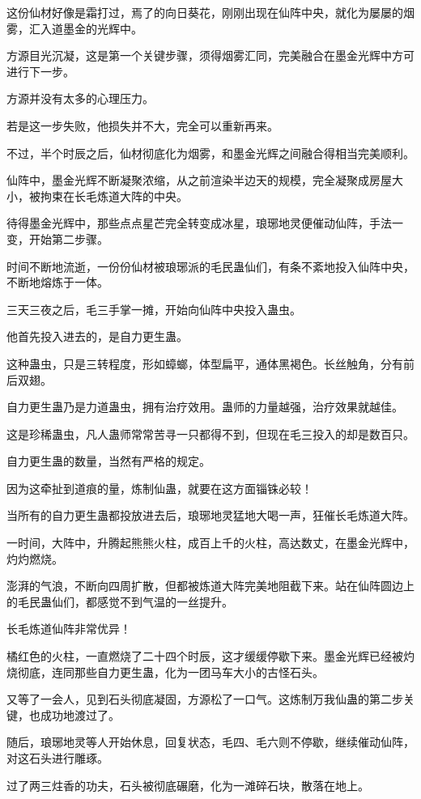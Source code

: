 \begin{this_body}
这份仙材好像是霜打过，焉了的向日葵花，刚刚出现在仙阵中央，就化为屡屡的烟雾，汇入道墨金的光辉中。

方源目光沉凝，这是第一个关键步骤，须得烟雾汇同，完美融合在墨金光辉中方可进行下一步。

方源并没有太多的心理压力。

若是这一步失败，他损失并不大，完全可以重新再来。

不过，半个时辰之后，仙材彻底化为烟雾，和墨金光辉之间融合得相当完美顺利。

仙阵中，墨金光辉不断凝聚浓缩，从之前渲染半边天的规模，完全凝聚成房屋大小，被拘束在长毛炼道大阵的中央。

待得墨金光辉中，那些点点星芒完全转变成冰星，琅琊地灵便催动仙阵，手法一变，开始第二步骤。

时间不断地流逝，一份份仙材被琅琊派的毛民蛊仙们，有条不紊地投入仙阵中央，不断地熔炼于一体。

三天三夜之后，毛三手掌一摊，开始向仙阵中央投入蛊虫。

他首先投入进去的，是自力更生蛊。

这种蛊虫，只是三转程度，形如蟑螂，体型扁平，通体黑褐色。长丝触角，分有前后双翅。

自力更生蛊乃是力道蛊虫，拥有治疗效用。蛊师的力量越强，治疗效果就越佳。

这是珍稀蛊虫，凡人蛊师常常苦寻一只都得不到，但现在毛三投入的却是数百只。

自力更生蛊的数量，当然有严格的规定。

因为这牵扯到道痕的量，炼制仙蛊，就要在这方面锱铢必较！

当所有的自力更生蛊都投放进去后，琅琊地灵猛地大喝一声，狂催长毛炼道大阵。

一时间，大阵中，升腾起熊熊火柱，成百上千的火柱，高达数丈，在墨金光辉中，灼灼燃烧。

澎湃的气浪，不断向四周扩散，但都被炼道大阵完美地阻截下来。站在仙阵圆边上的毛民蛊仙们，都感觉不到气温的一丝提升。

长毛炼道仙阵非常优异！

橘红色的火柱，一直燃烧了二十四个时辰，这才缓缓停歇下来。墨金光辉已经被灼烧彻底，连同那些自力更生蛊，化为一团马车大小的古怪石头。

又等了一会人，见到石头彻底凝固，方源松了一口气。这炼制万我仙蛊的第二步关键，也成功地渡过了。

随后，琅琊地灵等人开始休息，回复状态，毛四、毛六则不停歇，继续催动仙阵，对这石头进行雕琢。

过了两三炷香的功夫，石头被彻底碾磨，化为一滩碎石块，散落在地上。


\end{this_body}

